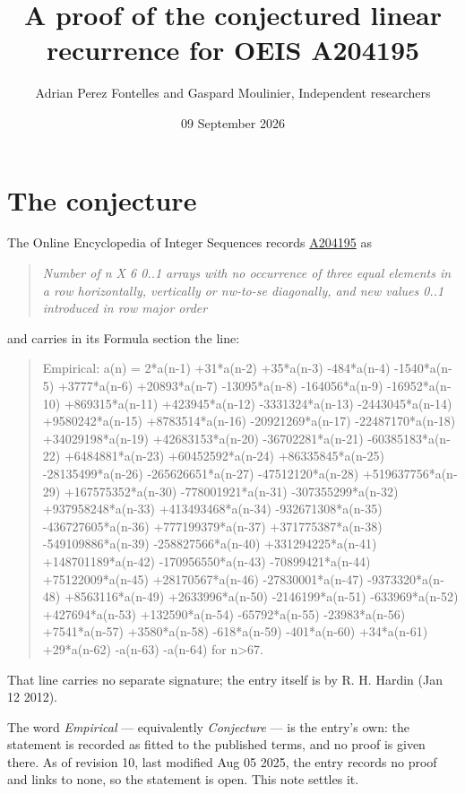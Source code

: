 \documentclass[11pt]{article}
\title{A proof of the conjectured linear recurrence for OEIS A204195}
\author{Adrian Perez Fontelles and Gaspard Moulinier, Independent researchers}
\date{09 September 2026}
\theoremstyle{definition}
\begin{document}
\maketitle
\section{The conjecture}

The Online Encyclopedia of Integer Sequences records \href{https://oeis.org/A204195}{A204195} as

\begin{quote}\itshape Number of n X 6 0..1 arrays with no occurrence of three equal elements in a row horizontally, vertically or nw-to-se diagonally, and new values 0..1 introduced in row major order\end{quote}

and carries in its Formula section the line:

\begin{quote}\ttfamily Empirical: a(n) = 2*a(n-1) +31*a(n-2) +35*a(n-3) -484*a(n-4) -1540*a(n-5) +3777*a(n-6) +20893*a(n-7) -13095*a(n-8) -164056*a(n-9) -16952*a(n-10) +869315*a(n-11) +423945*a(n-12) -3331324*a(n-13) -2443045*a(n-14) +9580242*a(n-15) +8783514*a(n-16) -20921269*a(n-17) -22487170*a(n-18) +34029198*a(n-19) +42683153*a(n-20) -36702281*a(n-21) -60385183*a(n-22) +6484881*a(n-23) +60452592*a(n-24) +86335845*a(n-25) -28135499*a(n-26) -265626651*a(n-27) -47512120*a(n-28) +519637756*a(n-29) +167575352*a(n-30) -778001921*a(n-31) -307355299*a(n-32) +937958248*a(n-33) +413493468*a(n-34) -932671308*a(n-35) -436727605*a(n-36) +777199379*a(n-37) +371775387*a(n-38) -549109886*a(n-39) -258827566*a(n-40) +331294225*a(n-41) +148701189*a(n-42) -170956550*a(n-43) -70899421*a(n-44) +75122009*a(n-45) +28170567*a(n-46) -27830001*a(n-47) -9373320*a(n-48) +8563116*a(n-49) +2633996*a(n-50) -2146199*a(n-51) -633969*a(n-52) +427694*a(n-53) +132590*a(n-54) -65792*a(n-55) -23983*a(n-56) +7541*a(n-57) +3580*a(n-58) -618*a(n-59) -401*a(n-60) +34*a(n-61) +29*a(n-62) -a(n-63) -a(n-64) for n>67.\end{quote}

That line carries no separate signature; the entry itself is by R. H. Hardin (Jan 12 2012).

The word {\itshape Empirical} --- equivalently {\itshape Conjecture} --- is the entry's own: the statement is recorded as fitted to the published terms, and no proof is given there. As of revision 10, last modified Aug 05 2025, the entry records no proof and links to none, so the statement is open. This note settles it.
\end{document}
